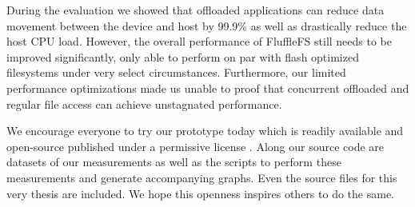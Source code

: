 During the evaluation we showed that offloaded applications can reduce
data movement between the device and host by 99.9\% as well as drastically
reduce the host CPU load. However, the overall performance of FluffleFS still
needs to be improved significantly, only able to perform on par with flash
optimized filesystems under very select circumstances. Furthermore, our
limited performance optimizations made us unable to proof that concurrent
offloaded and regular file access can achieve unstagnated performance.

We encourage everyone to try our prototype today which is readily available
and open-source published under a permissive license \cite{qemu-csd}. Along our
source code are datasets of our measurements as well as the scripts to perform
these measurements and generate accompanying graphs. Even the source files for
this very thesis are included. We hope this openness inspires others to do the
same.

